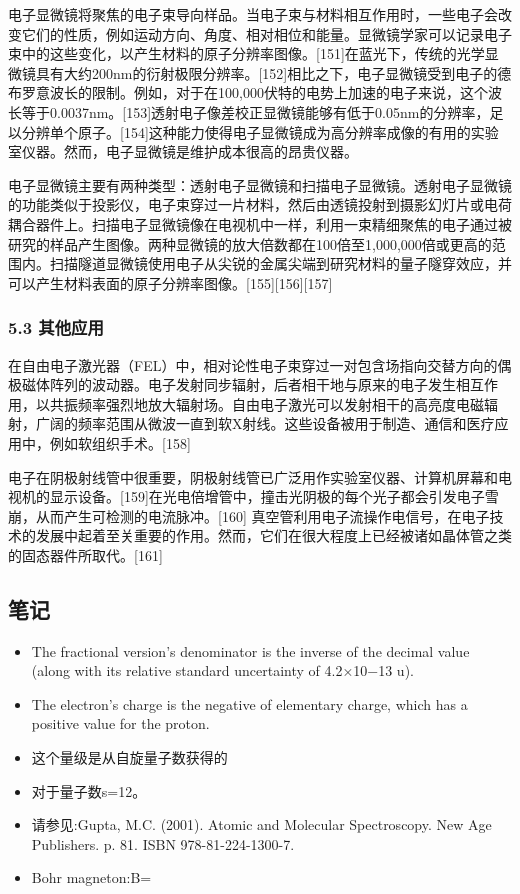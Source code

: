 电子显微镜将聚焦的电子束导向样品。当电子束与材料相互作用时，一些电子会改变它们的性质，例如运动方向、角度、相对相位和能量。显微镜学家可以记录电子束中的这些变化，以产生材料的原子分辨率图像。[151]在蓝光下，传统的光学显微镜具有大约200nm的衍射极限分辨率。[152]相比之下，电子显微镜受到电子的德布罗意波长的限制。例如，对于在100,000伏特的电势上加速的电子来说，这个波长等于0.0037nm。[153]透射电子像差校正显微镜能够有低于0.05nm的分辨率，足以分辨单个原子。[154]这种能力使得电子显微镜成为高分辨率成像的有用的实验室仪器。然而，电子显微镜是维护成本很高的昂贵仪器。

电子显微镜主要有两种类型：透射电子显微镜和扫描电子显微镜。透射电子显微镜的功能类似于投影仪，电子束穿过一片材料，然后由透镜投射到摄影幻灯片或电荷耦合器件上。扫描电子显微镜像在电视机中一样，利用一束精细聚焦的电子通过被研究的样品产生图像。两种显微镜的放大倍数都在100倍至1,000,000倍或更高的范围内。扫描隧道显微镜使用电子从尖锐的金属尖端到研究材料的量子隧穿效应，并可以产生材料表面的原子分辨率图像。[155][156][157]
\subsubsection{5.3 其他应用}
在自由电子激光器（FEL）中，相对论性电子束穿过一对包含场指向交替方向的偶极磁体阵列的波动器。电子发射同步辐射，后者相干地与原来的电子发生相互作用，以共振频率强烈地放大辐射场。自由电子激光可以发射相干的高亮度电磁辐射，广阔的频率范围从微波一直到软X射线。这些设备被用于制造、通信和医疗应用中，例如软组织手术。[158]

电子在阴极射线管中很重要，阴极射线管已广泛用作实验室仪器、计算机屏幕和电视机的显示设备。[159]在光电倍增管中，撞击光阴极的每个光子都会引发电子雪崩，从而产生可检测的电流脉冲。[160] 真空管利用电子流操作电信号，在电子技术的发展中起着至关重要的作用。然而，它们在很大程度上已经被诸如晶体管之类的固态器件所取代。[161]

\subsection{笔记}
\begin{itemize}
\item The fractional version's denominator is the inverse of the decimal value (along with its relative standard uncertainty of 4.2×10−13 u).
\item The electron's charge is the negative of elementary charge, which has a positive value for the proton.
\item 这个量级是从自旋量子数获得的
\item 对于量子数s=12。
\item 请参见:Gupta, M.C. (2001). Atomic and Molecular Spectroscopy. New Age Publishers. p. 81. ISBN 978-81-224-1300-7.
\item Bohr magneton:$$\mu B=\frac{}{}
\end{itemize}


